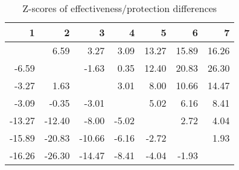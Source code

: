 \begin{table}[ht]
\centering
\begin{tabular}{rrrrrrr}
  \hline
1 & 2 & 3 & 4 & 5 & 6 & 7 \\ 
  \hline
 & 6.59 & 3.27 & 3.09 & 13.27 & 15.89 & 16.26 \\ 
  -6.59 &  & -1.63 & 0.35 & 12.40 & 20.83 & 26.30 \\ 
  -3.27 & 1.63 &  & 3.01 & 8.00 & 10.66 & 14.47 \\ 
  -3.09 & -0.35 & -3.01 &  & 5.02 & 6.16 & 8.41 \\ 
  -13.27 & -12.40 & -8.00 & -5.02 &  & 2.72 & 4.04 \\ 
  -15.89 & -20.83 & -10.66 & -6.16 & -2.72 &  & 1.93 \\ 
  -16.26 & -26.30 & -14.47 & -8.41 & -4.04 & -1.93 &  \\ 
   \hline
\end{tabular}
\caption{Z-scores of effectiveness/protection differences} 
\end{table}
